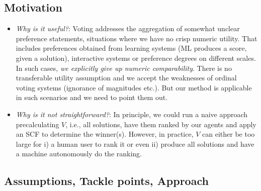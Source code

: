 \documentclass[10pt,a4paper,fleqn]{article}
\begin{document}
\subsection{Motivation}
\begin{itemize}
\item \emph{Why is it useful?}: Voting addresses the aggregation of somewhat unclear preference statements,
situations where we have no crisp numeric utility. That includes preferences obtained from
learning systems (ML produces a score, given a solution), interactive systems or 
preference degrees on different scales. In such cases, \emph{we explicitly give up 
numeric comparability}. There is no transferable utility assumption and we accept the 
weaknesses of ordinal voting systems (ignorance of magnitudes etc.). But our method is applicable in
such scenarios and we need to point them out.
\item \emph{Why is it not straightforward?}: In principle, we could run a naive approach precalculating $V$, i.e.,
all solutions, have them ranked by our agents and apply an SCF to determine the winner(s). However,
in practice, $V$ can either be too large for i) a human user to rank it or even ii) produce all solutions and have 
a machine autonomously do the ranking.
 
\end{itemize}

\subsection{Assumptions, Tackle points, Approach}
\end{document}
